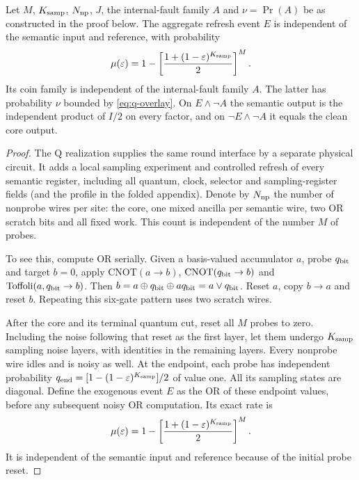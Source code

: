 \begin{lemma}\label{d:qubit-refresh}
Let \(M\), \(K_{\rm samp}\), \(N_{\rm np}\), \(J\), the internal-fault family \(A\) and \(\nu=\Pr(A)\) be as constructed in the proof below.
The aggregate refresh event \(E\) is independent of the semantic input and reference, with probability
\[
 \mu(\varepsilon)=1-\left[\frac{1+(1-\varepsilon)^{K_{\rm samp}}}{2}\right]^M.
\]
Its coin family is independent of the internal-fault family \(A\). The latter has probability \(\nu\) bounded by \eqref{eq:q-overlay}. On \(E\land\neg A\) the semantic output is the independent product of \(I/2\) on every factor, and on \(\neg E\land\neg A\) it equals the clean core output.
\end{lemma}
\begin{proof}
The \(\mathrm Q\) realization supplies the same round interface by a separate
physical circuit. It adds a local sampling experiment and controlled
refresh of every semantic register, including all quantum, clock,
selector and sampling-register fields (and the profile in the folded appendix). Denote by \(N_{\rm np}\) the number of
nonprobe wires per site: the core, one mixed ancilla per semantic wire,
two OR scratch bits and all fixed work. This count is independent of
the number \(M\) of probes.

To see this, compute OR serially. Given a basis-valued accumulator
\(a\), probe \(q_{\rm bit}\) and target \(b=0\), apply \(\mathrm{CNOT}(a\to b)\), \(\mathrm{CNOT}(q_{\rm bit}\to b)\) and
\(\mathrm{Toffoli}(a,q_{\rm bit}\to b)\). Then
\mbox{\(b=a\oplus q_{\rm bit}\oplus aq_{\rm bit}=a\lor q_{\rm bit}\)}.
Reset \(a\), copy \(b\to a\) and reset \(b\). Repeating this
six-gate pattern uses two scratch wires.

After the core and its terminal quantum cut, reset all \(M\) probes to
zero. Including the noise following that reset as the first layer,
let them undergo \(K_{\rm samp}\) sampling noise layers, with identities in the
remaining layers. Every nonprobe wire idles and is noisy as well.
At the endpoint, each probe has independent probability
\(q_{\rm end}=[1-(1-\varepsilon)^{K_{\rm samp}}]/2\) of value one. All its sampling states are
diagonal. Define the exogenous event \(E\) as the OR of these endpoint
values, before any subsequent noisy OR computation. Its exact rate is
\begin{equation}\label{eq:q-refresh}
 \mu(\varepsilon)=1-\left[\frac{1+(1-\varepsilon)^{K_{\rm samp}}}{2}\right]^M.
\end{equation}
It is independent of the semantic input and reference because of the
initial probe reset.


\end{proof}
